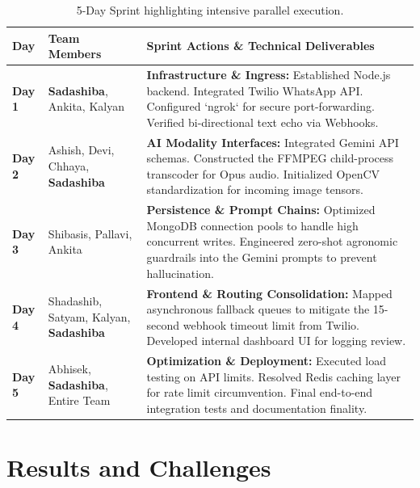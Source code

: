 \documentclass[12pt, a4paper]{report}
\begin{document}
\begin{table}[H]
    \centering
    \renewcommand{\arraystretch}{1.5}
    \begin{tabularx}{\textwidth}{|>{\centering\arraybackslash}p{1.5cm}|>{\raggedright\arraybackslash}p{4cm}|>{\raggedright\arraybackslash}X|}
        \hline
        \textbf{Day} & \textbf{Team Members} & \textbf{Sprint Actions \& Technical Deliverables} \\
        \hline
        \textbf{Day 1} & \textbf{Sadashiba}, Ankita, Kalyan & \textbf{Infrastructure \& Ingress:} Established Node.js backend. Integrated Twilio WhatsApp API. Configured `ngrok` for secure port-forwarding. Verified bi-directional text echo via Webhooks. \\
        \hline
        \textbf{Day 2} & Ashish, Devi, Chhaya, \textbf{Sadashiba} & \textbf{AI Modality Interfaces:} Integrated Gemini API schemas. Constructed the FFMPEG child-process transcoder for Opus audio. Initialized OpenCV standardization for incoming image tensors. \\
        \hline
        \textbf{Day 3} & Shibasis, Pallavi, Ankita & \textbf{Persistence \& Prompt Chains:} Optimized MongoDB connection pools to handle high concurrent writes. Engineered zero-shot agronomic guardrails into the Gemini prompts to prevent hallucination. \\
        \hline
        \textbf{Day 4} & Shadashib, Satyam, Kalyan, \textbf{Sadashiba} & \textbf{Frontend \& Routing Consolidation:} Mapped asynchronous fallback queues to mitigate the 15-second webhook timeout limit from Twilio. Developed internal dashboard UI for logging review. \\
        \hline
        \textbf{Day 5} & Abhisek, \textbf{Sadashiba}, Entire Team & \textbf{Optimization \& Deployment:} Executed load testing on API limits. Resolved Redis caching layer for rate limit circumvention. Final end-to-end integration tests and documentation finality. \\
        \hline
    \end{tabularx}
    \caption{5-Day Sprint highlighting intensive parallel execution.}
    \label{tab:sprint}
\end{table}

\chapter{Results and Challenges}
\end{document}
